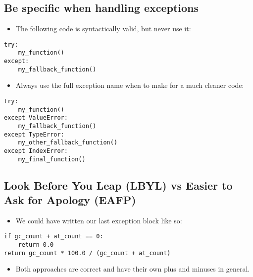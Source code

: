 \documentclass[aspectratio=1610,slidestop]{beamer}
\begin{document}
\subsection{Be specific when handling exceptions}
\begin{pframe}
 \vspace{-0.5cm}
 \begin{itemize}
  \item The following code is syntactically valid, but never use it:
 \end{itemize}
 \vspace{-0.1cm}
 \begin{pythoncode}
   \begin{verbatim}
try:
    my_function()
except:
    my_fallback_function()
    \end{verbatim}
  \end{pythoncode}
 \begin{itemize}
  \item Always use the full exception name when to make for a much cleaner code:
 \end{itemize}
 \vspace{-0.1cm}
 \begin{pythoncode}
   \begin{verbatim}
try:
    my_function()
except ValueError:
    my_fallback_function()
except TypeError:
    my_other_fallback_function()
except IndexError:
    my_final_function()
    \end{verbatim}
  \end{pythoncode}
\end{pframe}


\subsection{Look Before You Leap (LBYL) vs Easier to Ask for Apology (EAFP)}
\begin{pframe}
 \vspace{-0.5cm}
 \begin{itemize}
  \item We could have written our last exception block like so:
 \end{itemize}
 \begin{pythoncode}
   \begin{verbatim}
if gc_count + at_count == 0:
    return 0.0
return gc_count * 100.0 / (gc_count + at_count)
    \end{verbatim}
  \end{pythoncode}
 \begin{itemize}
  \item Both approaches are correct and have their own plus and minuses in
  general.
 \end{itemize}
\end{pframe}

\end{document}
